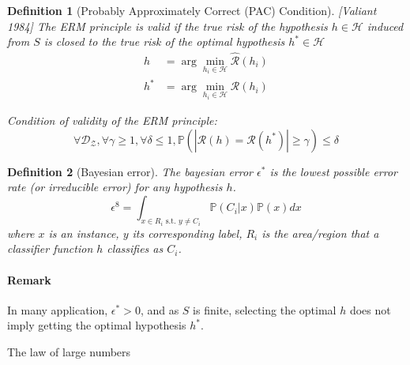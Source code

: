 \documentclass{article}
\newtheorem{defi}{Definition}
\begin{document}
\begin{defi}[Probably Approximately Correct (PAC) Condition][Valiant 1984]
The ERM principle is valid if the true risk of the hypothesis $h \in \mathcal{H}$ induced from $S$ is closed to the true risk of the optimal hypothesis $h^* \in \mathcal{H}$
\begin{align*}
h &= \arg \min_{h_i \in \mathcal{H}} \hat{\mathcal{R}}(h_i)\\
h^* &= \arg \min_{h_i\in \mathcal{H}} \mathcal{R}(h_i)
\end{align*}

Condition of validity of the ERM principle:
\[\forall \mathcal{D}_\mathcal{Z}, \forall \gamma \geq 1, \forall \delta \leq 1, \mathbb{P}(|\mathcal{R}(h)=\mathcal{R}(h^*)|\geq \gamma) \leq \delta\]
\end{defi}

\begin{defi}[Bayesian error]
The bayesian error $\epsilon^*$ is the lowest possible error rate (or irreducible error) for any hypothesis $h$.
\[\epsilon^8 = \int_{x\in R_i \text{ s.t. }y\neq C_i} \mathbb{P}(C_i|x)\mathbb{P}(x)dx\]
where $x$ is an instance, $y$ its corresponding label, $R_i$ is the area/region that a classifier function $h$ classifies as $C_i$.
\end{defi}


\paragraph{Remark}
In many application, $\epsilon^* >0$, and as $S$ is finite, selecting the optimal $h$ does not imply getting the optimal hypothesis $h^*$.
\bigskip


The law of large numbers
\end{document}
